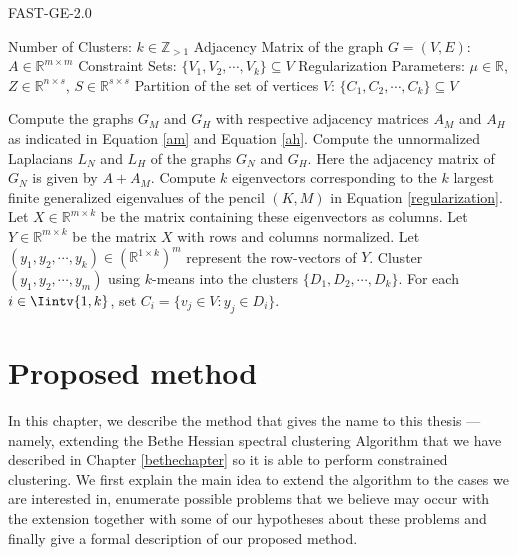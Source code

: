 \begin{algorithm}
\caption{FAST-GE-2.0}\label{fastge2alg}
\begin{algorithmic}[1]
   \Require 
      \Statex Number of Clusters: $k \in \mathbb Z_{>1}$
      \Statex Adjacency Matrix of the graph $G=(V,E)$: $A \in \mathbb R ^ {m \times m}$ 
      \Statex Constraint Sets: $\{ V_1, V_2, \cdots, V_k \} \subseteq V$
      \Statex Regularization Parameters: $\mu \in \mathbb R$, $Z \in \mathbb R ^{n \times s}$, $S \in \mathbb R ^{s \times s}$
   \Ensure 
      \Statex Partition of the set of vertices $V$: $\{ C_1, C_2, \cdots, C_k \} \subseteq V$
      \vspace{0.2 cm}

   \State Compute the graphs $G_M$ and $G_H$ with respective adjacency matrices $A_M$ and $A_H$ as indicated in Equation \vref{am} and Equation \vref{ah}.
   \State Compute the unnormalized Laplacians $L_N$ and $L_H$ of the graphs $G_N$ and $G_H$. Here the adjacency matrix of $G_N$ is given by $A + A_M$.
   \State Compute $k$ eigenvectors corresponding to the $k$ largest finite generalized eigenvalues of the pencil $(K,M)$ in Equation \vref{regularization}. Let $X \in \mathbb R ^{m \times k}$ be the matrix containing these eigenvectors as columns.
   \State Let $Y \in \mathbb R ^{m \times k}$ be the matrix $X$ with rows and columns normalized.
   \State Let $(y_1, y_2, \cdots, y_k) \in (\mathbb R^{1 \times k})^m$ represent the row-vectors of $Y$.
   \State Cluster $(y_1, y_2, \cdots, y_m)$ using $k$-means into the clusters $ \{ D_1, D_2, \cdots, D_k \}$.
   \State For each $i \in \Iintv{1,k}$, set $C_i = \{ v_j \in V: y_j \in D_i \}$.
\end{algorithmic}
\end{algorithm}



\chapter{Proposed method} \label{proposed_chapter}
In this chapter, we describe the method that gives the name to this thesis --- namely, extending the Bethe Hessian spectral clustering Algorithm that we have described in Chapter \ref{bethechapter} so it is able to perform constrained clustering.
We first explain the main idea to extend the algorithm to the cases we are interested in, enumerate possible problems that we believe may occur with the extension together with some of our hypotheses about these problems and finally give a formal description of our proposed method.

